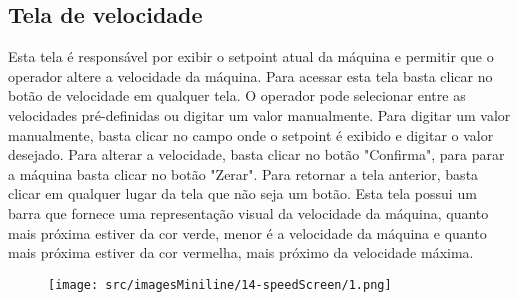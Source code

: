 \pagestyle{fancy}
\vspace*{40 pt}

\subsection{Tela de velocidade}
    Esta tela é responsável por exibir o setpoint atual da máquina e permitir que o operador altere a velocidade da máquina. Para acessar esta tela
    basta clicar no botão de velocidade em qualquer tela. O operador pode selecionar entre as velocidades pré-definidas ou digitar um valor manualmente.
    Para digitar um valor manualmente, basta clicar no campo onde o setpoint é exibido e digitar o valor desejado. Para alterar a velocidade, basta clicar no botão "Confirma",
    para parar a máquina basta clicar no botão "Zerar". Para retornar a tela anterior, basta clicar em qualquer lugar da tela que não seja um botão. Esta tela possui um 
    barra que fornece uma representação visual da velocidade da máquina, quanto mais próxima estiver da cor verde, menor é a velocidade da máquina e quanto mais próxima
    estiver da cor vermelha, mais próximo da velocidade máxima.
    \vspace*{\fill}
    \begin{figure}[h]
      \centering
      \texttt{[image: src/imagesMiniline/14-speedScreen/1.png]}
    \end{figure}
    \vspace*{\fill}
    
    
    